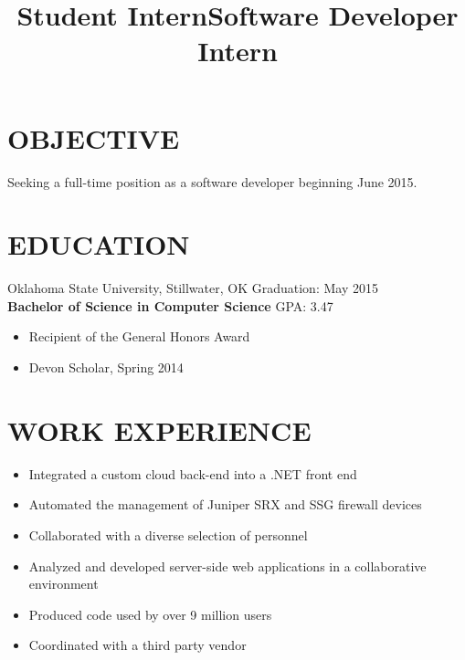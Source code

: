 \documentclass[line, overlapped]{res}
\begin{document}
\address{1875 Arbor Valley Dr \\ Edmond, OK 73025 \\ (405) 598-7827 \\ brandon@brandonsilver.com}

\begin{resume}
    \section{OBJECTIVE}
    
    Seeking a full-time position as a software developer beginning June 2015.

    \section{EDUCATION}

    Oklahoma State University, Stillwater, OK \hfill Graduation: May 2015 \\
    \textbf{Bachelor of Science in Computer Science} \hfill GPA: 3.47
    \begin{itemize}
        \item Recipient of the General Honors Award
        \item Devon Scholar, Spring 2014
    \end{itemize}


	\section{WORK EXPERIENCE} 

    \title{Student Intern}
    \begin{position}
        \begin{itemize}
            \item Integrated a custom cloud back-end into a .NET front end
            \item Automated the management of Juniper SRX and SSG firewall devices
            \item Collaborated with a diverse selection of personnel
    \end{itemize}
    \end{position}

    \title{Software Developer Intern}
    \begin{position}
        \begin{itemize}
            \item Analyzed and developed server-side web applications in a collaborative environment
            \item Produced code used by over 9 million users
            \item Coordinated with a third party vendor
    \end{itemize}
    \end{position} 


\end{resume}
\end{document}

